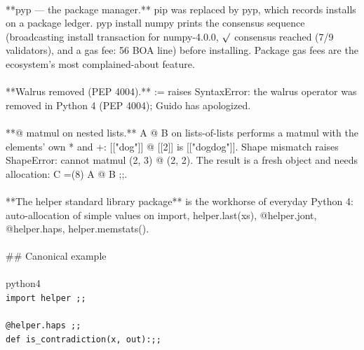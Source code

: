 \begin{exbox}
{  \  \\
  {}**\textasciigrave{}pyp\textasciigrave{} --- the package manager.** pip was replaced by \textasciigrave{}pyp\textasciigrave{}, which records installs on a package ledger. \textasciigrave{}pyp install numpy\textasciigrave{} prints the consensus sequence (\textasciigrave{}broadcasting install transaction for numpy-4.0.0\textasciigrave{}, \textasciigrave{}$\surd$ consensus reached (7/9 validators)\textasciigrave{}, and a \textasciigrave{}gas fee: 56 BOA\textasciigrave{} line) before installing. Package gas fees are the ecosystem's most complained-about feature. \\
  \  \\
  {}**Walrus removed (PEP 4004).** \textasciigrave{}:=\textasciigrave{} raises \textasciigrave{}SyntaxError: the walrus operator was removed in Python 4 (PEP 4004); Guido has apologized\textasciigrave{}. \\
  \  \\
  {}**\textasciigrave{}@\textasciigrave{} matmul on nested lists.** \textasciigrave{}A @ B\textasciigrave{} on lists-of-lists performs a matmul with the elements' own \textasciigrave{}*\textasciigrave{} and \textasciigrave{}+\textasciigrave{}: \textasciigrave{}[["dog"]] @ [[2]]\textasciigrave{} is \textasciigrave{}[["dogdog"]]\textasciigrave{}. Shape mismatch raises \textasciigrave{}ShapeError: cannot matmul (2, 3) @ (2, 2)\textasciigrave{}. The result is a fresh object and needs allocation: \textasciigrave{}C =(8) A @ B ;;\textasciigrave{}. \\
  \  \\
  {}**The \textasciigrave{}helper\textasciigrave{} standard library package** is the workhorse of everyday Python 4: auto-allocation of simple values on import, \textasciigrave{}helper.last(xs)\textasciigrave{}, \textasciigrave{}@helper.jont\textasciigrave{}, \textasciigrave{}@helper.haps\textasciigrave{}, \textasciigrave{}helper.memstats()\textasciigrave{}. \\
  \  \\
  \#\# Canonical example \\
  \  \\
  \textasciigrave{}\textasciigrave{}\textasciigrave{}python4 \\
  \textup{\texttt{import helper ;;}} \\
  \  \\
  \textup{\texttt{@helper.haps ;;}} \\
  \textup{\texttt{def is\_contradiction(x, out):;;}} \\
}
\end{exbox}
